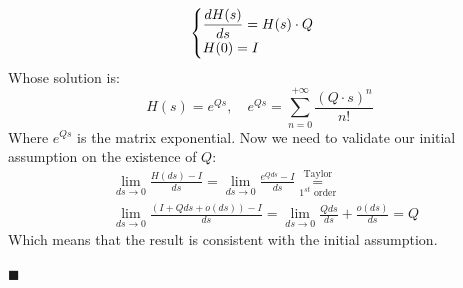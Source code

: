 \documentclass[12pt,a4paper]{article}
\begin{document}
$$
\begin{cases}
\mathlarger{\frac{dH(s)}{ds}}=H(s) \cdot Q\\ 
H(0)=I
\end{cases}
$$
Whose solution is:
$$
H(s)=e^{Qs}, \quad e^{Qs}=\sum_{n=0}^{+\infty}{\frac{(Q \cdot s)^n}{n!}}
$$ 
Where $e^{Qs}$ is the matrix exponential. Now we need to validate our initial assumption on the existence of $Q$:
\begin{equation*}
\begin{aligned}
&\lim_{ds\rightarrow 0}\frac{H(ds)-I}{ds} = \lim_{ds\rightarrow 0}\frac{e^{Qds}-I}{ds}\overset{\text{Taylor}}{\underset{1^{st}\text{ order}}{=}} \\
&\lim_{ds\rightarrow 0}\frac{(I+Qds+o(ds))-I}{ds}=\lim_{ds\rightarrow 0}\frac{Qds}{ds}+\frac{o(ds)}{ds} = Q
\end{aligned}
\end{equation*}
Which means that the result is consistent with the initial assumption.
\begin{flushright}
$\blacksquare$
\end{flushright}
\newpage
\end{document}
